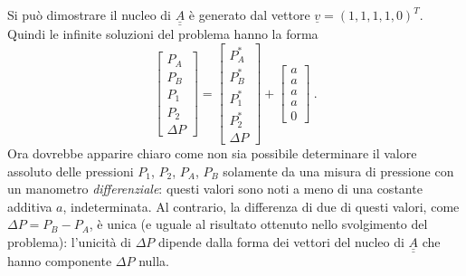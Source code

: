  Si può dimostrare il nucleo di $\underline{\underline{A}}$ è generato dal vettore $\underline{v}=(1,1,1,1,0)^T$. Quindi le infinite soluzioni del problema hanno la forma
\begin{equation}
 \begin{bmatrix}
  P_A \\ P_B \\ P_1 \\ P_2 \\ \Delta P 
 \end{bmatrix} = 
 \begin{bmatrix}
  P_A^* \\ P_B^* \\ P_1^* \\ P_2^* \\ \Delta P 
 \end{bmatrix} + 
 \begin{bmatrix}
   a \\ a \\ a \\ a \\ 0
 \end{bmatrix} \ .
\end{equation}
Ora dovrebbe apparire chiaro come non sia possibile determinare il valore assoluto delle pressioni $P_1$, $P_2$, $P_A$, $P_B$ solamente da una misura di pressione con un manometro \textit{differenziale}: questi valori sono noti a meno di una costante additiva $a$, indeterminata. Al contrario, la differenza di due di questi valori, come $\Delta P = P_B - P_A$, è unica (e uguale al risultato ottenuto nello svolgimento del problema): l'unicità di $\Delta P$ dipende dalla forma dei vettori del nucleo di $\underline{\underline{A}}$ che hanno componente $\Delta P$ nulla.



 
